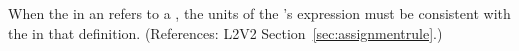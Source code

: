 When the  in an \InitialAssignment refers to a \Parameter,
the units of the \InitialAssignment's  expression must be
consistent with the  in that \Parameter definition.
(References: L2V2 Section~\ref{sec:assignmentrule}.)
